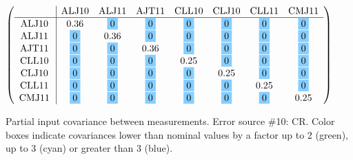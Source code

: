 \begin{table}[H]
\scriptsize
\begin{center}
\renewcommand{\arraystretch}{1.1}
\begin{math}\left(\begin{array}{c|ccccccc}
 & \mathrm{ALJ10} & 
\mathrm{ALJ11} & 
\mathrm{AJT11} & 
\mathrm{CLL10} & 
\mathrm{CLJ10} & 
\mathrm{CLL11} & 
\mathrm{CMJ11} \\
\hline
\mathrm{ALJ10} \hspace*{2pt} &       0.36 &  \colorbox{SkyBlue1}{$ 0$} &  \colorbox{SkyBlue1}{$ 0$} &  \colorbox{SkyBlue1}{$ 0$} &  \colorbox{SkyBlue1}{$ 0$} &  \colorbox{SkyBlue1}{$ 0$} &  \colorbox{SkyBlue1}{$ 0$} \\
\mathrm{ALJ11} \hspace*{2pt} &  \colorbox{SkyBlue1}{$ 0$} &       0.36 &  \colorbox{SkyBlue1}{$ 0$} &  \colorbox{SkyBlue1}{$ 0$} &  \colorbox{SkyBlue1}{$ 0$} &  \colorbox{SkyBlue1}{$ 0$} &  \colorbox{SkyBlue1}{$ 0$} \\
\mathrm{AJT11} \hspace*{2pt} &  \colorbox{SkyBlue1}{$ 0$} &  \colorbox{SkyBlue1}{$ 0$} &       0.36 &  \colorbox{SkyBlue1}{$ 0$} &  \colorbox{SkyBlue1}{$ 0$} &  \colorbox{SkyBlue1}{$ 0$} &  \colorbox{SkyBlue1}{$ 0$} \\
\mathrm{CLL10} \hspace*{2pt} &  \colorbox{SkyBlue1}{$ 0$} &  \colorbox{SkyBlue1}{$ 0$} &  \colorbox{SkyBlue1}{$ 0$} &       0.25 &  \colorbox{SkyBlue1}{$ 0$} &  \colorbox{SkyBlue1}{$ 0$} &  \colorbox{SkyBlue1}{$ 0$} \\
\mathrm{CLJ10} \hspace*{2pt} &  \colorbox{SkyBlue1}{$ 0$} &  \colorbox{SkyBlue1}{$ 0$} &  \colorbox{SkyBlue1}{$ 0$} &  \colorbox{SkyBlue1}{$ 0$} &       0.25 &  \colorbox{SkyBlue1}{$ 0$} &  \colorbox{SkyBlue1}{$ 0$} \\
\mathrm{CLL11} \hspace*{2pt} &  \colorbox{SkyBlue1}{$ 0$} &  \colorbox{SkyBlue1}{$ 0$} &  \colorbox{SkyBlue1}{$ 0$} &  \colorbox{SkyBlue1}{$ 0$} &  \colorbox{SkyBlue1}{$ 0$} &       0.25 &  \colorbox{SkyBlue1}{$ 0$} \\
\mathrm{CMJ11} \hspace*{2pt} &  \colorbox{SkyBlue1}{$ 0$} &  \colorbox{SkyBlue1}{$ 0$} &  \colorbox{SkyBlue1}{$ 0$} &  \colorbox{SkyBlue1}{$ 0$} &  \colorbox{SkyBlue1}{$ 0$} &  \colorbox{SkyBlue1}{$ 0$} &       0.25 \\
\end{array}\right)\end{math}
\caption{Partial input covariance between measurements. Error source \#10: CR. Color boxes indicate covariances lower than nominal values by a factor up to 2 (green), up to 3 (cyan) or greater than 3 (blue).}
\renewcommand{\arraystretch}{1}
\end{center}
\end{table}
